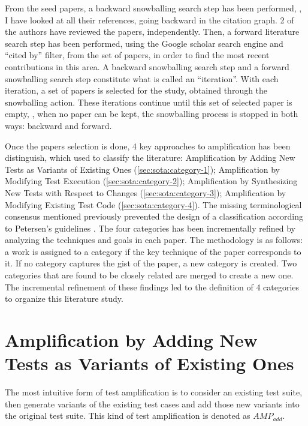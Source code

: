 From the seed papers, a backward snowballing search step \cite{jalali2012systematic} has been performed, \ie, I have looked at all their references, going backward in the citation graph. 
2 of the authors have reviewed the papers, independently. 
Then, a forward literature search step has been performed, using the Google scholar search engine and ``cited by'' filter, from the set of papers, in order to find the most recent contributions in this area.
A backward snowballing search step and a forward snowballing search step constitute what is called an ``iteration''.
With each iteration, a set of papers is selected for the study, obtained through the snowballing action.
These iterations continue until this set of selected paper is empty, \ie, when no paper can be kept, the snowballing process is stopped in both ways: backward and forward.

Once the papers selection is done, 4 key approaches to amplification has been distinguish, which used to classify the literature: 
Amplification by Adding New Tests as Variants of Existing Ones (\autoref{sec:sota:category-1});
Amplification by Modifying Test Execution (\autoref{sec:sota:category-2});
Amplification by Synthesizing New Tests with Respect to Changes (\autoref{sec:sota:category-3}); 
Amplification by Modifying Existing Test Code (\autoref{sec:sota:category-4}).
The missing terminological consensus mentioned previously prevented the design of a classification according to Petersen's guidelines
\cite{petersen2008systematic}.
The four categories has been incrementally refined by analyzing the techniques and goals in each paper.
The methodology is as follows: a work is assigned to a category if the key technique of the paper corresponds to it.
If no category captures the gist of the paper, a new category is created.
Two categories that are found to be closely related are merged to create a new one.
The incremental refinement of these findings led to the definition of 4 categories to organize this literature study.

\section{Amplification by Adding New Tests as Variants of Existing Ones}
\label{sec:sota:category-1}

The most intuitive form of test amplification is to consider an existing test suite, then generate variants of the existing test cases and add those new variants into the original test suite. 
This kind of test amplification is denoted as $AMP_{add}$.

